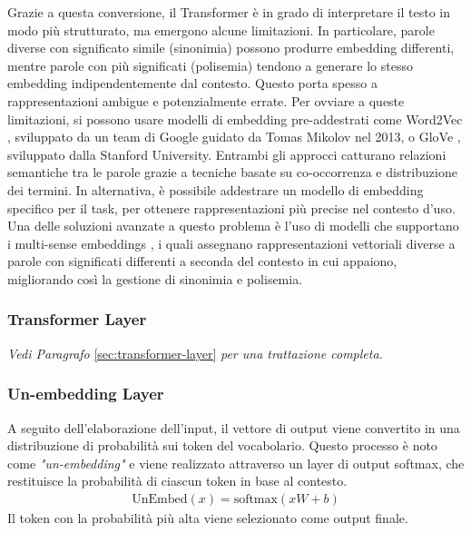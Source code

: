 Grazie a questa conversione, il Transformer è in grado di interpretare il testo in modo più strutturato, ma emergono alcune limitazioni. In particolare, parole diverse con significato simile (sinonimia) possono produrre embedding differenti, mentre parole con più significati (polisemia) tendono a generare lo stesso embedding indipendentemente dal contesto. Questo porta spesso a rappresentazioni ambigue e potenzialmente errate.
Per ovviare a queste limitazioni, si possono usare modelli di embedding pre-addestrati come Word2Vec \cite{mikolov2013efficientestimationwordrepresentations}, sviluppato da un team di Google guidato da Tomas Mikolov nel 2013, o GloVe \cite{pennington-etal-2014-glove}, sviluppato dalla Stanford University. Entrambi gli approcci catturano relazioni semantiche tra le parole grazie a tecniche basate su co-occorrenza e distribuzione dei termini.
In alternativa, è possibile addestrare un modello di embedding specifico per il task, per ottenere rappresentazioni più precise nel contesto d'uso. Una delle soluzioni avanzate a questo problema è l'uso di modelli che supportano i multi-sense embeddings \cite{camachocollados2018wordsenseembeddingssurvey,reisinger-mooney-2010-multi}, i quali assegnano rappresentazioni vettoriali diverse a parole con significati differenti a seconda del contesto in cui appaiono, migliorando così la gestione di sinonimia e polisemia.

\subsubsection{Transformer Layer}
\textit{Vedi Paragrafo} \ref{sec:transformer-layer} \textit{per una trattazione completa.}

\subsubsection{Un-embedding Layer}
A seguito dell'elaborazione dell'input, il vettore di output viene convertito in una distribuzione di probabilità sui token del vocabolario. Questo processo è noto come \textit{"un-embedding"} e viene realizzato attraverso un layer di output softmax, che restituisce la probabilità di ciascun token in base al contesto.
\begin{align}
	\text{UnEmbed}(x) = \text{softmax}(xW + b)
\end{align}
Il token con la probabilità più alta viene selezionato come output finale.

